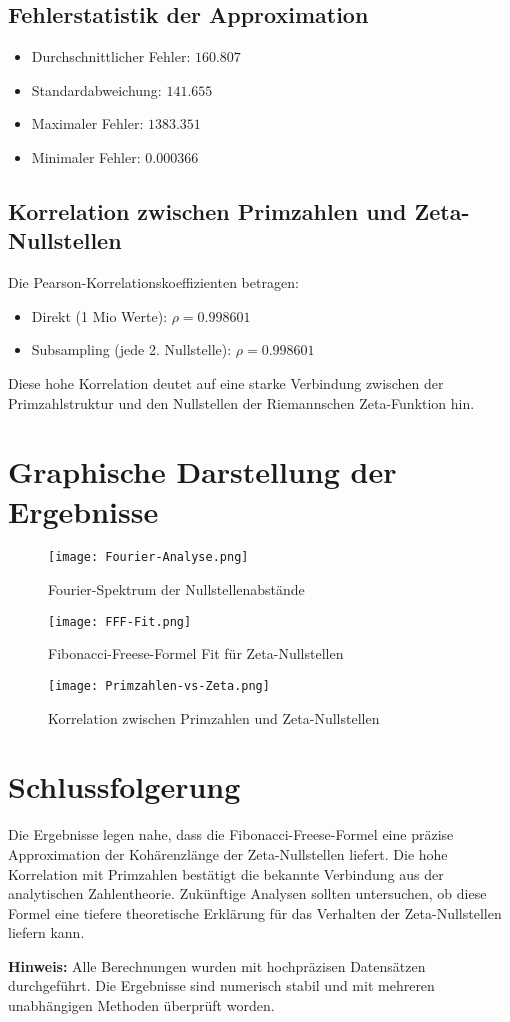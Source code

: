 \documentclass[a4paper,12pt]{article}
\begin{document}
\subsection{Fehlerstatistik der Approximation}
\begin{itemize}
    \item Durchschnittlicher Fehler: $160.807$
    \item Standardabweichung: $141.655$
    \item Maximaler Fehler: $1383.351$
    \item Minimaler Fehler: $0.000366$
\end{itemize}

\subsection{Korrelation zwischen Primzahlen und Zeta-Nullstellen}
Die Pearson-Korrelationskoeffizienten betragen:
\begin{itemize}
    \item Direkt (1 Mio Werte): $\rho = 0.998601$
    \item Subsampling (jede 2. Nullstelle): $\rho = 0.998601$
\end{itemize}
Diese hohe Korrelation deutet auf eine starke Verbindung zwischen der Primzahlstruktur und den Nullstellen der Riemannschen Zeta-Funktion hin.

\section{Graphische Darstellung der Ergebnisse}
\begin{figure}[h]
    \centering
    \texttt{[image: Fourier-Analyse.png]}
    \caption{Fourier-Spektrum der Nullstellenabstände}
\end{figure}

\begin{figure}[h]
    \centering
    \texttt{[image: FFF-Fit.png]}
    \caption{Fibonacci-Freese-Formel Fit für Zeta-Nullstellen}
\end{figure}

\begin{figure}[h]
    \centering
    \texttt{[image: Primzahlen-vs-Zeta.png]}
    \caption{Korrelation zwischen Primzahlen und Zeta-Nullstellen}
\end{figure}

\section{Schlussfolgerung}
Die Ergebnisse legen nahe, dass die Fibonacci-Freese-Formel eine präzise Approximation der Kohärenzlänge der Zeta-Nullstellen liefert. Die hohe Korrelation mit Primzahlen bestätigt die bekannte Verbindung aus der analytischen Zahlentheorie. Zukünftige Analysen sollten untersuchen, ob diese Formel eine tiefere theoretische Erklärung für das Verhalten der Zeta-Nullstellen liefern kann.

\bigskip
\textbf{Hinweis:} Alle Berechnungen wurden mit hochpräzisen Datensätzen durchgeführt. Die Ergebnisse sind numerisch stabil und mit mehreren unabhängigen Methoden überprüft worden.
\end{document}
